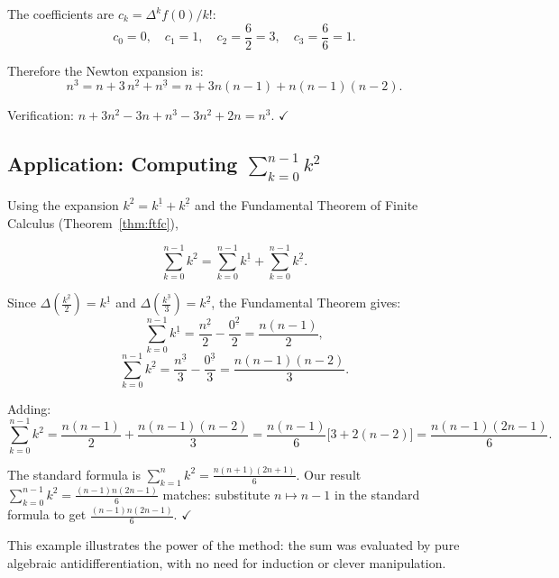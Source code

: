 The coefficients are \(c_k = \Delta^k f(0)/k!\):
\[
c_0 = 0,\quad c_1 = 1,\quad c_2 = \frac{6}{2} = 3,\quad c_3 = \frac{6}{6} = 1.
\]

Therefore the Newton expansion is:
\[
n^3
= n + 3\,n^{\underline{2}} + n^{\underline{3}}
= n + 3n(n-1) + n(n-1)(n-2).
\]

Verification: \(n + 3n^2 - 3n + n^3 - 3n^2 + 2n = n^3.\) \(\checkmark\)

\subsection*{\texorpdfstring{Application: Computing \(\sum_{k=0}^{n-1} k^2\)}{Application: Computing sum k=0 to n-1 k squared}}

Using the expansion \(k^2 = k^{\underline{1}} + k^{\underline{2}}\) and the
Fundamental Theorem of Finite Calculus (Theorem~\ref{thm:ftfc}),

\[
\sum_{k=0}^{n-1} k^2
= \sum_{k=0}^{n-1} k^{\underline{1}} + \sum_{k=0}^{n-1} k^{\underline{2}}.
\]

Since \(\Delta\!\left(\tfrac{k^{\underline{2}}}{2}\right) = k^{\underline{1}}\) and
\(\Delta\!\left(\tfrac{k^{\underline{3}}}{3}\right) = k^{\underline{2}}\),
the Fundamental Theorem gives:
\[
\sum_{k=0}^{n-1} k^{\underline{1}}
= \frac{n^{\underline{2}}}{2} - \frac{0^{\underline{2}}}{2}
= \frac{n(n-1)}{2},
\]
\[
\sum_{k=0}^{n-1} k^{\underline{2}}
= \frac{n^{\underline{3}}}{3} - \frac{0^{\underline{3}}}{3}
= \frac{n(n-1)(n-2)}{3}.
\]

Adding:
\[
\sum_{k=0}^{n-1} k^2
= \frac{n(n-1)}{2} + \frac{n(n-1)(n-2)}{3}
= \frac{n(n-1)}{6}\bigl[3 + 2(n-2)\bigr]
= \frac{n(n-1)(2n-1)}{6}.
\]

\begin{remark*}
The standard formula is \(\displaystyle\sum_{k=1}^{n} k^2 = \tfrac{n(n+1)(2n+1)}{6}\).
Our result \(\displaystyle\sum_{k=0}^{n-1} k^2 = \tfrac{(n-1)n(2n-1)}{6}\) matches:
substitute \(n \mapsto n-1\) in the standard formula to get
\(\tfrac{(n-1)n(2n-1)}{6}\). \(\checkmark\)

This example illustrates the power of the method: the sum was evaluated
by pure algebraic antidifferentiation, with no need for induction or
clever manipulation.
\end{remark*}

